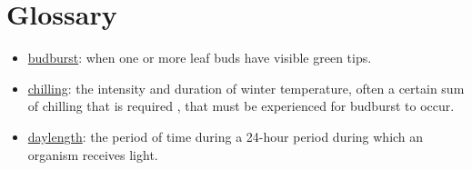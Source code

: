 \documentclass{article}
\begin{document}
\section* {Glossary}
\begin{itemize}
\item \underline{budburst}: when one or more leaf buds have visible green tips. 
\item \underline{chilling}: the intensity and duration of winter temperature, often a certain sum of chilling that is  required \citep[e.g., some amount of hours or days of cold temperatures, defined by a specific critical temperature or range of temperatures, such as between 0 and 7.2 \degree C,][]{richardson1974}, that must be experienced for budburst to occur.
\item \underline{daylength}: the period of time during a 24-hour period during which an organism receives light.


\end{itemize}
\end{document}
